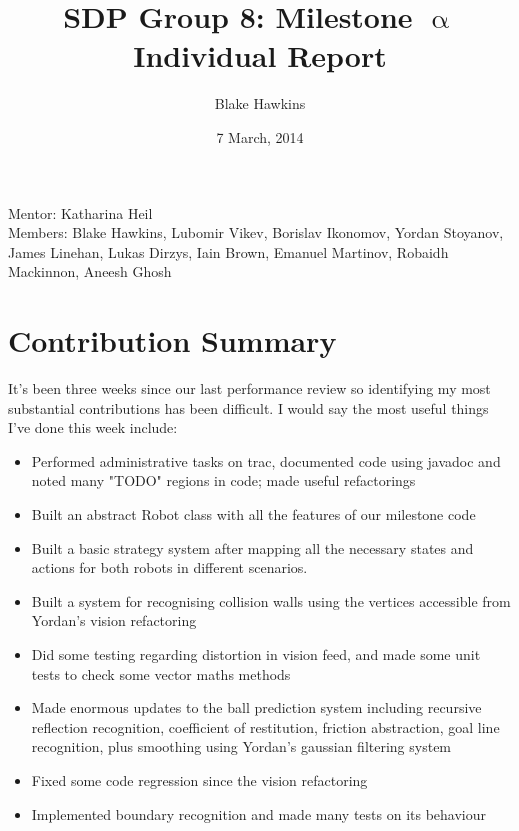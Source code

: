 \documentclass[a4paper,11pt]{article}
\title{SDP Group 8: Milestone $\upalpha$ Individual Report} %
\author{Blake Hawkins} %
\date{7 March, 2014} %
\begin{document}
\maketitle %

\begin{center}
Mentor: Katharina Heil %
\\
Members: Blake Hawkins, %
Lubomir Vikev,
Borislav Ikonomov,
Yordan Stoyanov,
James Linehan,
Lukas Dirzys,
Iain Brown,
Emanuel Martinov,
Robaidh Mackinnon,
Aneesh Ghosh

\end{center}


\section{Contribution Summary}

It's been three weeks since our last performance review so identifying my most substantial contributions has been difficult. I would say the most useful things I've done this week include:

\begin{itemize}
	\item Performed administrative tasks on trac, documented code using javadoc and noted many "TODO" regions in code; made useful refactorings
	\item Built an abstract Robot class with all the features of our milestone code
	\item Built a basic strategy system after mapping all the necessary states and actions for both robots in different scenarios.
	\item Built a system for recognising collision walls using the vertices accessible from Yordan's vision refactoring
	\item Did some testing regarding distortion in vision feed, and made some unit tests to check some vector maths methods
	\item Made enormous updates to the ball prediction system including recursive reflection recognition, coefficient of restitution, friction abstraction, goal line recognition, plus smoothing using Yordan's gaussian filtering system
	\item Fixed some code regression since the vision refactoring
	\item Implemented boundary recognition and made many tests on its behaviour
\end{itemize}
\end{document}
